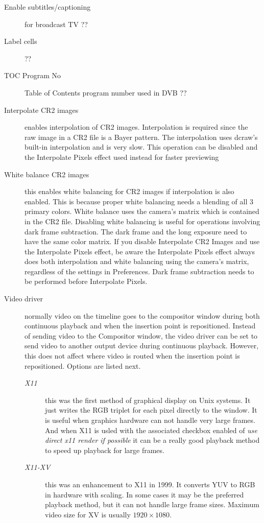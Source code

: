\begin{description}
    \item[Enable subtitles/captioning] for broadcast TV ??
    \item[Label cells] ??
    \item[TOC Program No] Table of Contents program number used in DVB ??
    \item[Interpolate CR2 images] enables interpolation of CR2 images. Interpolation is required since the raw image in a CR2 file is a Bayer pattern. The interpolation uses dcraw's built-in interpolation and is very slow. This operation can be disabled and the Interpolate Pixels effect used instead for faster previewing
    \item[White balance CR2 images] this enables white balancing for CR2 images if interpolation is also enabled. This is because proper white balancing needs a blending of all 3 primary colors. White balance uses the camera's matrix which is contained in the CR2 file.  Disabling white balancing is useful for operations involving dark frame subtraction. The dark frame and the long exposure need to have the same color matrix.  If you disable Interpolate CR2 Images and use the Interpolate Pixels effect, be aware the Interpolate Pixels effect always does both interpolation and white balancing using the camera's matrix, regardless of the settings in Preferences. Dark frame subtraction needs to be performed before Interpolate Pixels.
    \item[Video driver] normally video on the timeline goes to the compositor window during both continuous   playback and when the insertion point is repositioned. Instead of sending video to the Compositor window, the video driver can be set to send video to another output device during continuous playback. However, this does not affect where video is routed when the insertion point is repositioned. Options are listed next.
    \begin{description}
        \item[\textit{X11}] this was the first method of graphical display on Unix systems. It just writes the RGB triplet for each pixel directly to the window. It is useful when graphics hardware can not handle very large frames.  And when X11 is usled with the associated checkbox enabled of \textit{use direct x11 render if possible} it can be a really good playback method to speed up playback for large frames.
        \item[\textit{X11-XV}] this was an enhancement to X11 in 1999. It converts YUV to RGB in hardware with scaling. In some cases it may be the preferred playback method, but it can not handle large frame sizes. Maximum video size for XV is usually $1920\times1080$.

\end{description}
\end{description}
